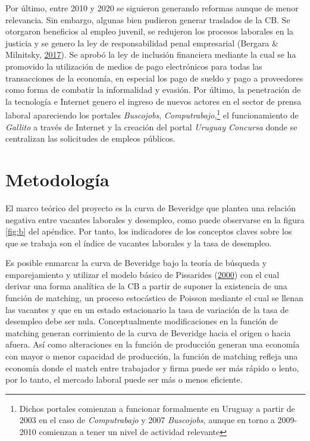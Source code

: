 \documentclass[12pt,oneside]{reedthesis}
\begin{document}
Por último, entre 2010 y 2020 se siguieron generando reformas aunque de menor relevancia. Sin embargo, algunas bien pudieron generar traslados de la CB. Se otorgaron beneficios al empleo juvenil, se redujeron los procesos laborales en la justicia y se genero la ley de responsabilidad penal empresarial (Bergara \& Milnitsky, \protect\hyperlink{ref-Bergara2017}{2017}). Se aprobó la ley de inclusión financiera mediante la cual se ha promovido la utilización de medios de pago electrónicos para todas las transacciones de la economía, en especial los pago de sueldo y pago a proveedores como forma de combatir la informalidad y evasión. Por último, la penetración de la tecnología e Internet genero el ingreso de nuevos actores en el sector de prensa laboral apareciendo los portales \emph{Buscojobs}, \emph{Computrabajo},\footnote{Dichos portales comienzan a funcionar formalmente en Uruguay a partir de 2003 en el caso de \emph{Computrabajo} y 2007 \emph{Buscojobs}, aunque en torno a 2009-2010 comienzan a tener un nivel de actividad relevante} el funcionamiento de \emph{Gallito} a través de Internet y la creación del portal \emph{Uruguay Concursa} donde se centralizan las solicitudes de empleos públicos.

\hypertarget{Metodologia}{%
\chapter{Metodología}\label{Metodologia}}

El marco teórico del proyecto es la curva de Beveridge que plantea una relación negativa entre vacantes laborales y desempleo, como puede observarse en la figura \ref{fig:b} del apéndice. Por tanto, los indicadores de los conceptos claves sobre los que se trabaja son el índice de vacantes laborales y la tasa de desempleo.

Es posible enmarcar la curva de Beveridge bajo la teoría de búsqueda y emparejamiento y utilizar el modelo básico de Pissarides (\protect\hyperlink{ref-Pissarides2000}{2000}) con el cual derivar una forma analítica de la CB a partir de suponer la existencia de una función de matching, un proceso estocástico de Poisson mediante el cual se llenan las vacantes y que en un estado estacionario la tasa de variación de la tasa de desempleo debe ser nula. Conceptualmente modificaciones en la función de matching generan corrimiento de la curva de Beveridge hacia el origen o hacia afuera. Así como alteraciones en la función de producción generan una economía con mayor o menor capacidad de producción, la función de matching refleja una economía donde el match entre trabajador y firma puede ser más rápido o lento, por lo tanto, el mercado laboral puede ser más o menos eficiente.
\end{document}
